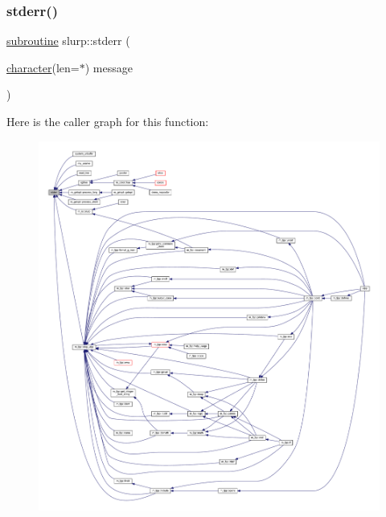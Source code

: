 \subsubsection{\texorpdfstring{stderr()}{stderr()}}
{\footnotesize\ttfamily \hyperlink{M__stopwatch_83_8txt_acfbcff50169d691ff02d4a123ed70482}{subroutine} slurp\+::stderr (\begin{DoxyParamCaption}\item[{\hyperlink{option__stopwatch_83_8txt_abd4b21fbbd175834027b5224bfe97e66}{character}(len=$\ast$)}]{message }\end{DoxyParamCaption})\hspace{0.3cm}{\ttfamily [private]}}

Here is the caller graph for this function\+:
\nopagebreak
\begin{figure}[H]
\begin{center}
\leavevmode
\includegraphics[width=350pt]{M__io_8f90_a448cccd08d4d6bce645ffbbf14cdfa7e_icgraph}
\end{center}
\end{figure}
